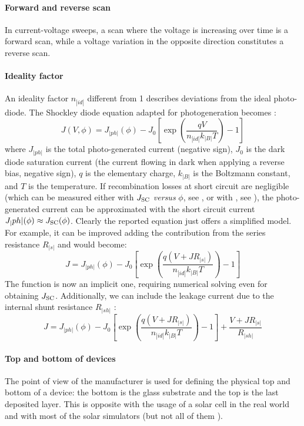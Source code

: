 		\paragraph{Forward and reverse scan}\label{characterization_fwdrev}
		In current-voltage sweeps, a scan where the voltage is increasing over time is a forward scan, while a voltage variation in the opposite direction constitutes a reverse scan.

		\paragraph{Ideality factor}
		An ideality factor $n_|id|$ different from 1 describes deviations from the ideal photo-diode.
		The Shockley diode equation adapted for photogeneration becomes \cite{Calado2019}:
		\begin{equation} \label{eq:photodiode}
			J(V,\phi) = J_|ph|(\phi) - J_0\left[\exp(\frac{qV}{n_|id|k_|B|T})-1\right]
		\end{equation}
		where $J_|ph|$ is the total photo\hyp{}generated current (negative sign), $J_0$ is the dark diode saturation current (the current flowing in dark when applying a reverse bias, negative sign), $q$ is the elementary charge, $k_|B|$ is the Boltzmann constant, and $T$ is the temperature.
		If recombination losses at short circuit are negligible (which can be measured either with $J_\mathrm{SC}$ \textsl{versus} $\phi$, see , or with , see ), the photo\hyp{}generated current can be approximated with the short circuit current $J_|ph|(\phi) \approx J_\mathrm{SC}(\phi)$.
		Clearly the reported equation just offers a simplified model.
		For example, it can be improved adding the contribution from the series resistance $R_|s|$ and would become:
		\begin{equation}\label{eq:series_resistance}
			J = J_|ph|(\phi) - J_0\left[\exp(\frac{q(V+JR_|s|)}{n_|id|k_|B|T})-1\right]
		\end{equation}
		The function is now an implicit one, requiring numerical solving even for obtaining $J_\mathrm{SC}$.
		Additionally, we can include the leakage current due to the internal shunt resistance $R_|sh|$ \cite{Nelson2003}:
		\begin{equation}
			J = J_|ph|(\phi) - J_0\left[\exp(\frac{q(V+JR_|s|)}{n_|id|k_|B|T})-1\right] + \frac{V+JR_|s|}{R_|sh|}
		\end{equation}

		\paragraph{Top and bottom of devices}
		The point of view of the manufacturer is used for defining the physical top and bottom of a device: the bottom is the glass substrate and the top is the last deposited layer.
		This is opposite with the usage of a solar cell in the real world and with most of the solar simulators (but not all of them
		\cite{Fluxim}).

